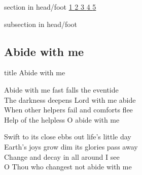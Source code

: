 \documentclass[aspectratio=169]{beamer}
\begin{document}
{
{ 
 {
 \begin{beamercolorbox}[ht=4.5ex,dp=1.5ex,%
      leftskip=.3cm,rightskip=.3cm plus1fil]{section in head/foot}
 \fontsize{12}{25}\selectfont 
\hyperlink{Abide with me[]1}{1  }\hyperlink{Abide with me[]2}{2  }\hyperlink{Abide with me[]3}{3  }\hyperlink{Abide with me[]4}{4  }\hyperlink{Abide with me[]5}{5  } 
 \end{beamercolorbox}%
  \begin{beamercolorbox}[ht=2.5ex,dp=1.125ex,%
   leftskip=.3cm,rightskip=.3cm plus1fil]{subsection in head/foot}
   \insertauthor
 \end{beamercolorbox}%
 }
}
\subsection{Abide with me}
\hypertarget{Abide with me[]}{}
\begin{frame}{}
 \vfill
  \centering
  \begin{beamercolorbox}[sep=8pt,center,shadow=true,rounded=true]{title}
    Abide with me     
  \end{beamercolorbox}
  \vfill
\end{frame}

\hypertarget{Abide with me[]1}{}
\begin{frame}{}
\fontsize{18.367346938775512}{22.040816326530614}\selectfont

Abide with me fast falls the eventide\\ 
The darkness deepens Lord with me abide\\ 
When other helpers fail and comforts flee\\ 
Help of the helpless O abide with me

\end{frame}
\hypertarget{Abide with me[]2}{}
\begin{frame}{}
\fontsize{18.367346938775512}{22.040816326530614}\selectfont

Swift to its close ebbs out life's little day\\ 
Earth's joys grow dim its glories pass away\\ 
Change and decay in all around I see\\ 
O Thou who changest not abide with me

\end{frame}
\hypertarget{Abide with me[]3}{}
\begin{frame}{}
\fontsize{18.367346938775512}{22.040816326530614}\selectfont


\end{frame}}
\end{document}
